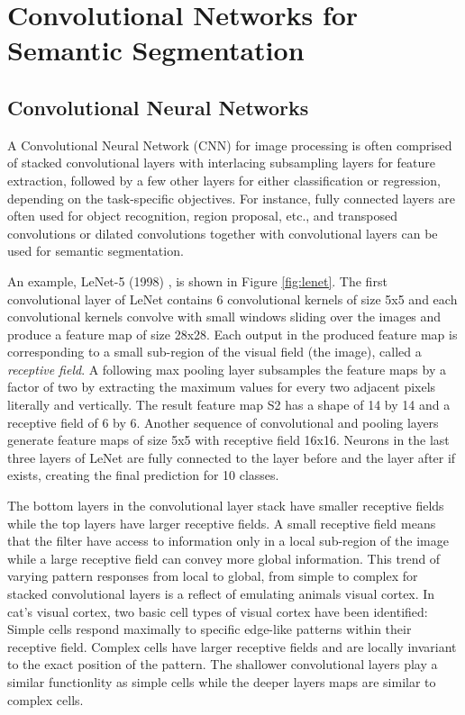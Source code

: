 \appendix



\section{Convolutional Networks for Semantic Segmentation}
\subsection{Convolutional Neural Networks}

A Convolutional Neural Network (CNN) for image processing is often comprised of stacked convolutional layers with interlacing subsampling layers for feature extraction, followed by a few other layers for either classification or regression, depending on the task-specific objectives.
For instance, fully connected layers are often used for object recognition\cite{lecun1998gradient,krizhevsky2012imagenet}, region proposal\cite{ren2015faster}, etc., and transposed convolutions or dilated convolutions together with convolutional layers can be used for semantic segmentation\cite{long2015fully,yu2015multi}.

An example, LeNet-5 (1998) \cite{lecun1998gradient}, is shown in Figure \ref{fig:lenet}.
The first convolutional layer of LeNet contains 6 convolutional kernels of size 5x5 and each convolutional kernels convolve with small windows sliding over the images and produce a feature map of size 28x28.
Each output in the produced feature map is corresponding to a small sub-region of the visual field (the image), called a \textit{receptive field}.
A following max pooling layer subsamples the feature maps by a factor of two by extracting the maximum values for every two adjacent pixels literally and vertically.
The result feature map S2 has a shape of 14 by 14 and a receptive field of 6 by 6.
Another sequence of convolutional and pooling layers generate feature maps of size 5x5 with receptive field 16x16.
Neurons in the last three layers of LeNet are fully connected to the layer before and the layer after if exists, creating the final prediction for 10 classes.

The bottom layers in the convolutional layer stack have smaller receptive fields while the top layers have larger receptive fields.
A small receptive field means that the filter have access to information only in a local sub-region of the image while a large receptive field can convey more global information.
This trend of varying pattern responses from local to global, from simple to complex for stacked convolutional layers is a reflect of emulating animals visual cortex.
In cat's visual cortex\cite{hubel1962receptive}, two basic cell types of visual cortex have been identified:
Simple cells respond maximally to specific edge-like patterns within their receptive field.
Complex cells have larger receptive fields and are locally invariant to the exact position of the pattern.
The shallower convolutional layers play a similar functionlity as simple cells while the deeper layers maps are similar to complex cells.

